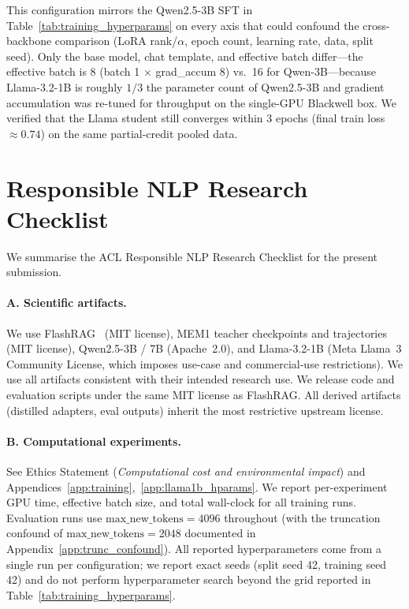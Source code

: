 This configuration mirrors the Qwen2.5-3B SFT in Table~\ref{tab:training_hyperparams} on every axis that could confound the cross-backbone comparison (LoRA rank/$\alpha$, epoch count, learning rate, data, split seed). Only the base model, chat template, and effective batch differ---the effective batch is 8 (batch 1 $\times$ grad\_accum 8) vs.\ 16 for Qwen-3B---because Llama-3.2-1B is roughly $1/3$ the parameter count of Qwen2.5-3B and gradient accumulation was re-tuned for throughput on the single-GPU Blackwell box. We verified that the Llama student still converges within 3 epochs (final train loss $\approx 0.74$) on the same partial-credit pooled data.

\section{Responsible NLP Research Checklist}
\label{app:responsible_nlp}

We summarise the ACL Responsible NLP Research Checklist for the present submission.

\paragraph{A. Scientific artifacts.}
We use FlashRAG~\cite{jin2025flashrag} (MIT license), MEM1 teacher checkpoints and trajectories~\cite{zhou2025mem1} (MIT license), Qwen2.5-3B / 7B (Apache~2.0), and Llama-3.2-1B (Meta Llama~3 Community License, which imposes use-case and commercial-use restrictions). We use all artifacts consistent with their intended research use. We release code and evaluation scripts under the same MIT license as FlashRAG. All derived artifacts (distilled adapters, eval outputs) inherit the most restrictive upstream license.

\paragraph{B. Computational experiments.}
See Ethics Statement (\emph{Computational cost and environmental impact}) and Appendices~\ref{app:training},~\ref{app:llama1b_hparams}. We report per-experiment GPU time, effective batch size, and total wall-clock for all training runs. Evaluation runs use $\text{max\_new\_tokens}=4096$ throughout (with the truncation confound of $\text{max\_new\_tokens}=2048$ documented in Appendix~\ref{app:trunc_confound}). All reported hyperparameters come from a single run per configuration; we report exact seeds (split seed 42, training seed 42) and do not perform hyperparameter search beyond the grid reported in Table~\ref{tab:training_hyperparams}.

